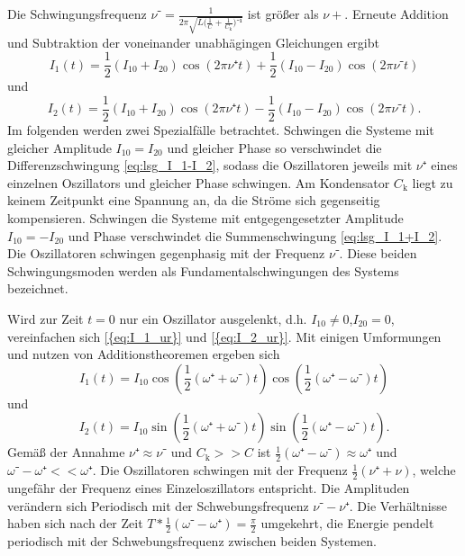 Die Schwingungsfrequenz $\nu⁻=\frac{1}{2\pi\sqrt{L\bigl({\frac{1}{C}+\frac{1}{C_\mathup{k}}}\bigr)⁻¹}}$ ist größer als $\nu+$.
Erneute Addition und Subtraktion der voneinander unabhägingen Gleichungen ergibt
\begin{equation}
	I_1(t)=\frac{1}{2}({I_{10}}+{I_{20}})\cos(2\pi\nu⁺t)+\frac{1}{2}({I_{10}}-{I_{20}})\cos(2\pi\nu⁻t)
	\label{eq:I_1_ur}
\end{equation}
und
\begin{equation}
	I_2(t)=\frac{1}{2}({I_{10}}+{I_{20}})\cos(2\pi\nu⁺t)-\frac{1}{2}({I_{10}}-{I_{20}})\cos(2\pi\nu⁻t).
	\label{eq:I_2_ur}
\end{equation}
Im folgenden werden zwei Spezialfälle betrachtet. 
Schwingen die Systeme mit gleicher Amplitude $I_{10}=I_{20}$ und gleicher Phase so verschwindet die Differenzschwingung \eqref{eq:lsg_I_1-I_2}, sodass die Oszillatoren jeweils mit $\nu⁺$ eines einzelnen Oszillators und gleicher Phase schwingen.
 Am Kondensator $C_\mathup{k}$ liegt zu keinem Zeitpunkt eine Spannung an, da die Ströme sich gegenseitig kompensieren.
Schwingen die Systeme mit entgegengesetzter Amplitude  $I_{10}=-I_{20}$ und Phase verschwindet die Summenschwingung \eqref{eq:lsg_I_1+I_2}. Die Oszillatoren schwingen gegenphasig mit der Frequenz $\nu⁻$.
Diese beiden Schwingungsmoden werden als Fundamentalschwingungen des Systems bezeichnet.

Wird zur Zeit $t=0$ nur ein Oszillator ausgelenkt, d.h. $I_{10}\neq0$,$I_{20}=0$, vereinfachen sich \eqref{{eq:I_1_ur}} und \eqref{{eq:I_2_ur}}. 
Mit einigen Umformungen und nutzen von Additionstheoremen ergeben sich
\begin{equation}
	I_1(t)=I_{10}\cos(\frac{1}{2}(\omega⁺+\omega⁻)t)\cos(\frac{1}{2}(\omega⁺-\omega⁻)t)
\end{equation}
und
\begin{equation}
	I_2(t)=I_{10}\sin(\frac{1}{2}(\omega⁺+\omega⁻)t)\sin(\frac{1}{2}(\omega⁺-\omega⁻)t).
\end{equation}
Gemäß der Annahme $\nu⁺\approx\nu⁻$ und $C_\mathup{k}>>C$ ist $\frac{1}{2}(\omega⁺-\omega⁻)\approx\omega⁺$ und $\omega⁻-\omega⁺<<\omega⁺$.
Die Oszillatoren schwingen mit der Frequenz $\frac{1}{2}(\nu⁺+\nu)$, welche ungefähr der Frequenz eines Einzeloszillators entspricht. 
Die Amplituden verändern sich Periodisch mit der Schwebungsfrequenz $\nu⁻-\nu⁺$. 
Die Verhältnisse haben sich nach der Zeit $T*\frac{1}{2}({\omega⁻-\omega⁺})=\frac{\pi}{2}$ umgekehrt, die Energie pendelt periodisch mit der Schwebungsfrequenz zwischen beiden Systemen.

